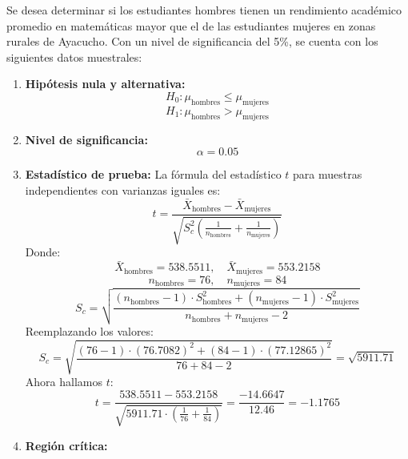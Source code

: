 \documentclass[
]{article}
\begin{document}
Se desea determinar si los estudiantes hombres tienen un rendimiento
académico promedio en matemáticas mayor que el de las estudiantes
mujeres en zonas rurales de Ayacucho. Con un nivel de significancia del
5\%, se cuenta con los siguientes datos muestrales:

\begin{enumerate}
  \item \textbf{Hipótesis nula y alternativa:}
    \[
    H_0: \mu_{\text{hombres}} \leq \mu_{\text{mujeres}}
    \]
    \[
    H_1: \mu_{\text{hombres}} > \mu_{\text{mujeres}}
    \]

  \item \textbf{Nivel de significancia:}
    \[
    \alpha = 0.05
    \]

  \item \textbf{Estadístico de prueba:}
    La fórmula del estadístico \(t\) para muestras independientes con varianzas iguales es:
    \[
    t = \frac{\bar{X}_{\text{hombres}} - \bar{X}_{\text{mujeres}}}{\sqrt{S_c^2 \left( \frac{1}{n_{\text{hombres}}} + \frac{1}{n_{\text{mujeres}}} \right)}}
    \]
    Donde:
    \[
    \bar{X}_{\text{hombres}} = 538.5511, \quad \bar{X}_{\text{mujeres}} = 553.2158
    \]
    \[
    n_{\text{hombres}} = 76, \quad n_{\text{mujeres}} = 84
    \]
    \[
    S_c = \sqrt{\frac{(n_{\text{hombres}} - 1) \cdot S_{\text{hombres}}^2 + (n_{\text{mujeres}} - 1) \cdot S_{\text{mujeres}}^2}{n_{\text{hombres}} + n_{\text{mujeres}} - 2}}
    \]
    Reemplazando los valores:
    \[
    S_c = \sqrt{\frac{(76 - 1) \cdot (76.7082)^2 + (84 - 1) \cdot (77.12865)^2}{76 + 84 - 2}} = \sqrt{5911.71}
    \]
    Ahora hallamos \(t\):
    \[
    t = \frac{538.5511 - 553.2158}{\sqrt{5911.71 \cdot \left( \frac{1}{76} + \frac{1}{84} \right)}} = \frac{-14.6647}{12.46} = -1.1765
    \]
  \item \textbf{Región crítica:}
    \begin{figure}[ht]
    \centering
\end{figure}
\end{enumerate}
\end{document}
